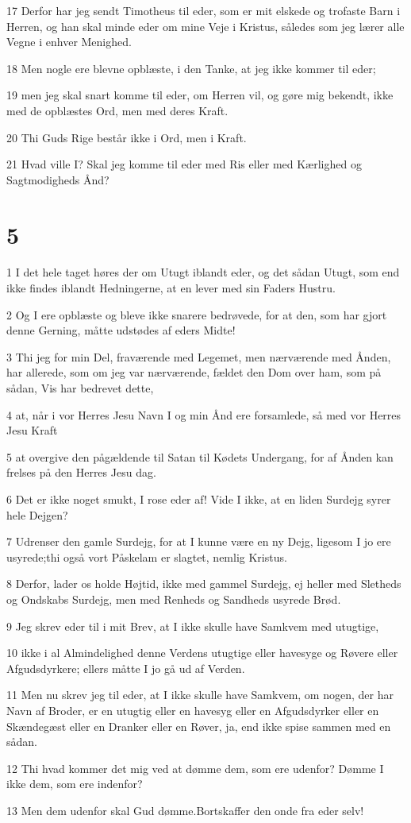 \par 17 Derfor har jeg sendt Timotheus til eder, som er mit elskede og trofaste Barn i Herren, og han skal minde eder om mine Veje i Kristus, således som jeg lærer alle Vegne i enhver Menighed.
\par 18 Men nogle ere blevne opblæste, i den Tanke, at jeg ikke kommer til eder;
\par 19 men jeg skal snart komme til eder, om Herren vil, og gøre mig bekendt, ikke med de opblæstes Ord, men med deres Kraft.
\par 20 Thi Guds Rige består ikke i Ord, men i Kraft.
\par 21 Hvad ville I? Skal jeg komme til eder med Ris eller med Kærlighed og Sagtmodigheds Ånd?

\chapter{5}

\par 1 I det hele taget høres der om Utugt iblandt eder, og det sådan Utugt, som end ikke findes iblandt Hedningerne, at en lever med sin Faders Hustru.
\par 2 Og I ere opblæste og bleve ikke snarere bedrøvede, for at den, som har gjort denne Gerning, måtte udstødes af eders Midte!
\par 3 Thi jeg for min Del, fraværende med Legemet, men nærværende med Ånden, har allerede, som om jeg var nærværende, fældet den Dom over ham, som på sådan, Vis har bedrevet dette,
\par 4 at, når i vor Herres Jesu Navn I og min Ånd ere forsamlede, så med vor Herres Jesu Kraft
\par 5 at overgive den pågældende til Satan til Kødets Undergang, for af Ånden kan frelses på den Herres Jesu dag.
\par 6 Det er ikke noget smukt, I rose eder af! Vide I ikke, at en liden Surdejg syrer hele Dejgen?
\par 7 Udrenser den gamle Surdejg, for at I kunne være en ny Dejg, ligesom I jo ere usyrede;thi også vort Påskelam er slagtet, nemlig Kristus.
\par 8 Derfor, lader os holde Højtid, ikke med gammel Surdejg, ej heller med Sletheds og Ondskabs Surdejg, men med Renheds og Sandheds usyrede Brød.
\par 9 Jeg skrev eder til i mit Brev, at I ikke skulle have Samkvem med utugtige,
\par 10 ikke i al Almindelighed denne Verdens utugtige eller havesyge og Røvere eller Afgudsdyrkere; ellers måtte I jo gå ud af Verden.
\par 11 Men nu skrev jeg til eder, at I ikke skulle have Samkvem, om nogen, der har Navn af Broder, er en utugtig eller en havesyg eller en Afgudsdyrker eller en Skændegæst eller en Dranker eller en Røver, ja, end ikke spise sammen med en sådan.
\par 12 Thi hvad kommer det mig ved at dømme dem, som ere udenfor? Dømme I ikke dem, som ere indenfor?
\par 13 Men dem udenfor skal Gud dømme.Bortskaffer den onde fra eder selv!

